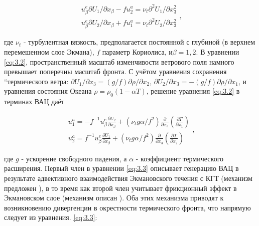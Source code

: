 \begin{equation} \label{eq:3.2} \begin{array}{l} {u_{\beta }^{e} \partial U_{1} /\partial x_{\beta } -fu_{2}^{a} =\nu _{t} \partial ^{2} U_{1} /\partial x_{3}^{2} } \\ {u_{\beta }^{e} \partial U_{2} /\partial x_{\beta } +fu_{1}^{a} =\nu _{t} \partial ^{2} U_{2} /\partial x_{3}^{2} } \end{array},  \end{equation} 



\noindent где $\nu _{t} $ - турбулентная вязкость, предполагается постоянной с глубиной (в верхнем перемешенном слое Экмана), $f$ параметр Кориолиса, и$\beta =1,2$. В уравнении \eqref{eq:3.2}, пространственный масштаб изменчивости ветрового поля намного превышает поперечны масштаб фронта. С учётом уравнения сохранения ``термического ветра: $\partial U_{1} /\partial x_{3} =(g/f)\partial \rho /\partial x_{2} $, $\partial U_{2} /\partial x_{3} =-(g/f)\partial \rho /\partial x_{1} $, и уравнения состояния Океана $\rho =\rho _{0} (1-\alpha T)$, решение уравнения \eqref{eq:3.2} в терминах ВАЦ даёт



\begin{equation} \label{eq:3.3} \begin{array}{l} {u_{1}^{a} =-f^{-1} u_{\beta }^{e} \frac{\partial U_{2} }{\partial x_{\beta } } +(\nu _{t} g\alpha /f^{2} )\frac{\partial }{\partial x_{3} } \left(\frac{\partial T}{\partial x_{1}^{} } \right)} \\ {u_{2}^{a} =f^{-1} u_{\beta }^{e} \frac{\partial U_{1} }{\partial x_{\beta } } +(\nu _{t} g\alpha /f^{2} )\frac{\partial }{\partial x_{3} } \left(\frac{\partial T}{\partial x_{2}^{} } \right)} \end{array},  \end{equation} 



\noindent где $g$ - ускорение свободного падения, а $\alpha $ - коэффициент термического расширения. Первый член в уравнении \eqref{eq:3.3} описывает генерацию ВАЦ в результате адвективного взаимодействия Экмановского течения с КГТ (механизм предложен \citep{Klein1990}), в то время как второй член учитывает фрикционный эффект в Экмановском слое (механизм описан \citep{Garrett1981}). Оба этих механизма приводят к возникновению дивергенции в окрестности термического фронта, что напрямую следует из уравнения. \eqref{eq:3.3}:



